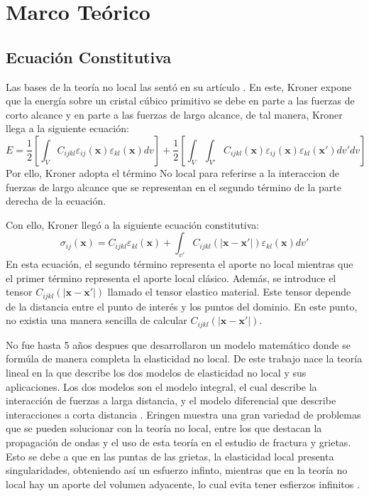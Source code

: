 \section{Marco Teórico}
\label{sc:teoria}

\subsection{Ecuación Constitutiva}
Las bases de la teoría no local las sentó \textcite{Kroner1967} en su artículo \textit{}. En este, Kroner expone que la energía sobre un cristal cúbico primitivo se debe en parte a las fuerzas de corto alcance y en parte a las fuerzas de largo alcance, de tal manera, Kroner llega a la siguiente ecuación:
\begin{equation}
	E=\frac{1}{2}\left[\int_{V}C_{ijkl}\varepsilon_{ij}(\boldsymbol{x})\varepsilon_{kl}(\boldsymbol{x})dv\right]+\frac{1}{2}\left[\int_{V}\int_{V'}C_{ijkl}(\boldsymbol{x})\varepsilon_{ij}(\boldsymbol{x})\varepsilon_{kl}(\boldsymbol{x'})dv'dv\right]
\end{equation}
Por ello, Kroner adopta el término No local para referirse a la interaccion de fuerzas de largo alcance que se representan en el segundo término de la parte derecha de la ecuación.

Con ello, Kroner llegó a la siguiente ecuación constitutiva:
\begin{equation}
	\sigma_{ij}(\boldsymbol{x})=C_{ijkl}\varepsilon_{kl}(\boldsymbol{x})+\int_{v'}C_{ijkl}(|\boldsymbol{x}-\boldsymbol{x'}|)\varepsilon_{kl}(\boldsymbol{x})dv'
\end{equation}
En esta ecuación, el segundo término representa el aporte no local mientras que el primer término representa el aporte local clásico. Además, se introduce el tensor $C_{ijkl}(|\boldsymbol{x}-\boldsymbol{x'}|)$ llamado el tensor elastico material. Este tensor depende de la distancia entre el punto de interés y los puntos del dominio. En este punto, no existia una manera sencilla de calcular $C_{ijkl}(|\boldsymbol{x}-\boldsymbol{x'}|)$.

No fue hasta 5 años despues que \textcite{Eringen1972} desarrollaron un modelo matemático donde se formúla de manera completa la elasticidad no local. De este trabajo nace la teoría lineal en la que \textcite{Eringen1987} describe los dos modelos de elasticidad no local y sus aplicaciones. Los dos modelos son el modelo integral, el cual describe la interacción de fuerzas a larga distancia, y el modelo diferencial que describe interacciones a corta distancia \parencite{Polizzotto2001}. Eringen muestra una gran variedad de problemas que se pueden solucionar con la teoría no local, entre los que destacan la propagación de ondas y el uso de esta teoría en el estudio de fractura y grietas. Esto se debe a que en las puntas de las grietas, la elasticidad local presenta singularidades, obteniendo así un esfuerzo infinto, mientras que en la teoría no local hay un aporte del volumen adyacente, lo cual evita tener esfierzos infinitos \parencite{Eringen1987}. 

